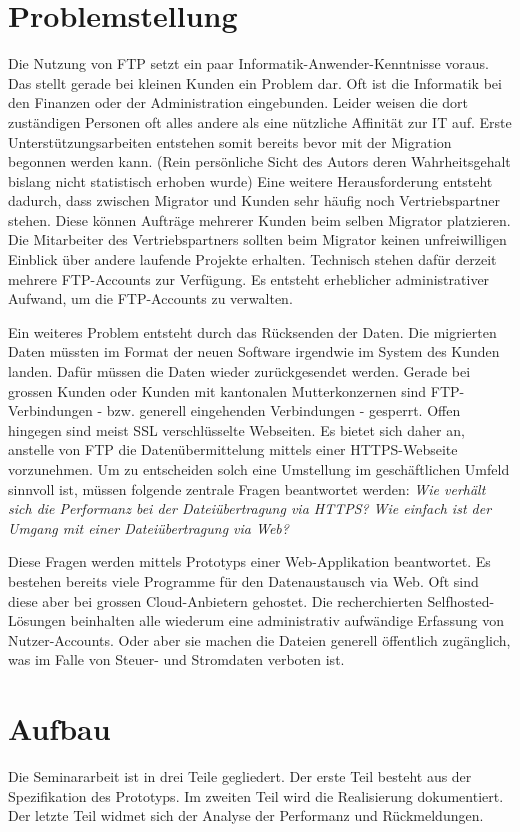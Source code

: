 \section{Problemstellung}
Die Nutzung von FTP setzt ein paar Informatik-Anwender-Kenntnisse voraus. Das stellt gerade bei kleinen Kunden ein Problem dar.
Oft ist die Informatik bei den Finanzen oder der Administration eingebunden. 
Leider weisen die dort zuständigen Personen oft alles andere als eine nützliche Affinität zur IT auf. 
Erste Unterstützungsarbeiten entstehen somit bereits bevor mit der Migration begonnen werden kann. 
(Rein persönliche Sicht des Autors deren Wahrheitsgehalt bislang nicht statistisch erhoben wurde)
Eine weitere Herausforderung entsteht dadurch, dass zwischen Migrator und Kunden sehr häufig noch Vertriebspartner stehen. 
Diese können Aufträge mehrerer Kunden beim selben Migrator platzieren. 
Die Mitarbeiter des Vertriebspartners sollten beim Migrator keinen unfreiwilligen Einblick über andere laufende Projekte erhalten. 
Technisch stehen dafür derzeit mehrere FTP-Accounts zur Verfügung. Es entsteht erheblicher administrativer Aufwand, um die FTP-Accounts zu verwalten.

Ein weiteres Problem entsteht durch das Rücksenden der Daten. 
Die migrierten Daten müssten im Format der neuen Software irgendwie im System des Kunden landen.
Dafür müssen die Daten wieder zurückgesendet werden. Gerade bei grossen Kunden oder Kunden mit kantonalen Mutterkonzernen sind FTP-Verbindungen - bzw. generell eingehenden Verbindungen - gesperrt. 
Offen hingegen sind meist SSL verschlüsselte Webseiten. 
Es bietet sich daher an, anstelle von FTP die Datenübermittelung mittels einer HTTPS-Webseite vorzunehmen. 
Um zu entscheiden solch eine Umstellung im geschäftlichen Umfeld sinnvoll ist, müssen folgende zentrale Fragen beantwortet werden:
\textit{Wie verhält sich die Performanz bei der Dateiübertragung via HTTPS?} 
\textit{Wie einfach ist der Umgang mit einer Dateiübertragung via Web?}

Diese Fragen werden mittels Prototyps einer Web-Applikation beantwortet. 
Es bestehen bereits viele Programme für den Datenaustausch via Web. Oft sind diese aber bei grossen Cloud-Anbietern gehostet. 
Die recherchierten Selfhosted-Lösungen beinhalten alle wiederum eine administrativ aufwändige Erfassung von Nutzer-Accounts.
Oder aber sie machen die Dateien generell öffentlich zugänglich, was im Falle von Steuer- und Stromdaten verboten ist.

\section{Aufbau}
Die Seminararbeit ist in drei Teile gegliedert. 
Der erste Teil besteht aus der Spezifikation des Prototyps. 
Im zweiten Teil wird die Realisierung dokumentiert. 
Der letzte Teil widmet sich der Analyse der Performanz und Rückmeldungen.

